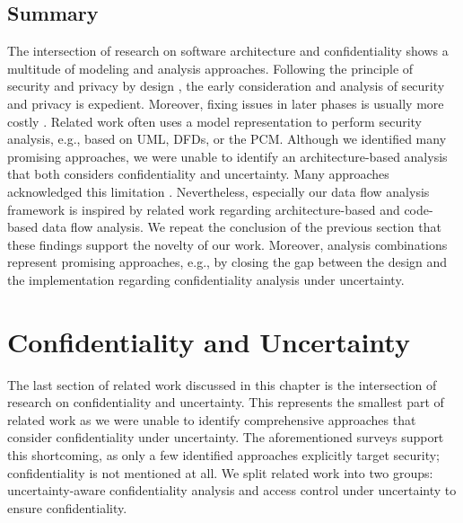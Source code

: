 \subsection{Summary}

The intersection of research on software architecture and confidentiality shows a multitude of modeling and analysis approaches.
Following the principle of security and privacy by design \cite{schaar_privacy_2010}, the early consideration and analysis of security and privacy is expedient.
Moreover, fixing issues in later phases is usually more costly \cite{shull_what_2002,boehm_software_2001}.
Related work often uses a model representation to perform security analysis, e.g., based on \ac{UML}, \acp{DFD}, or the \ac{PCM}.
Although we identified many promising approaches, we were unable to identify an architecture-based analysis that both considers confidentiality and uncertainty.
Many approaches acknowledged this limitation \cite{walter_context-based_2023,seifermann_architectural_2022,gerking_model-driven_2020}.
Nevertheless, especially our data flow analysis framework \cite{boltz_extensible_2024} is inspired by related work regarding architecture-based \cite{seifermann_architectural_2022} and code-based \cite{schneider_automatic_2023} data flow analysis.
We repeat the conclusion of the previous section that these findings support the novelty of our work.
Moreover, analysis combinations represent promising approaches, e.g., by closing the gap between the design and the implementation regarding confidentiality analysis under uncertainty.






\section{Confidentiality and Uncertainty}%
\label{sec:relatedwork:confidentialityXuncertainty}

The last section of related work discussed in this chapter is the intersection of research on confidentiality and uncertainty.
This represents the smallest part of related work as we were unable to identify comprehensive approaches that consider confidentiality under uncertainty.
The aforementioned surveys \cite{troya_uncertainty_2021,sobhy_evaluation_2021} support this shortcoming, as only a few identified approaches explicitly target security; confidentiality is not mentioned at all.
We split related work into two groups: uncertainty-aware confidentiality analysis and access control under uncertainty to ensure confidentiality.


